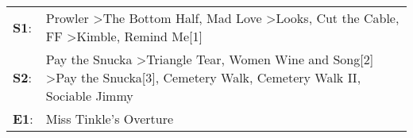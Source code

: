 \begin{supertabular}{p{0.03\textwidth}p{0.92\textwidth}}
 \textbf{S1}:  &  Prowler\textsuperscript{} \textgreater \enspace The Bottom Half\textsuperscript{}, \enspace Mad Love\textsuperscript{} \textgreater \enspace Looks\textsuperscript{}, \enspace Cut the Cable\textsuperscript{}, \enspace FF\textsuperscript{} \textgreater \enspace Kimble\textsuperscript{}, \enspace Remind Me[1]\textsuperscript{}  \enspace  \\
 \textbf{S2}:  &  Pay the Snucka\textsuperscript{} \textgreater \enspace Triangle Tear\textsuperscript{}, \enspace Women Wine and Song[2]\textsuperscript{} \textgreater \enspace Pay the Snucka[3]\textsuperscript{}, \enspace Cemetery Walk\textsuperscript{}, \enspace Cemetery Walk II\textsuperscript{}, \enspace Sociable Jimmy\textsuperscript{}  \enspace  \\
 \textbf{E1}:  &                                                                                                                                                                                                                                                                                               Miss Tinkle's Overture\textsuperscript{}  \enspace  \\
\end{supertabular}
